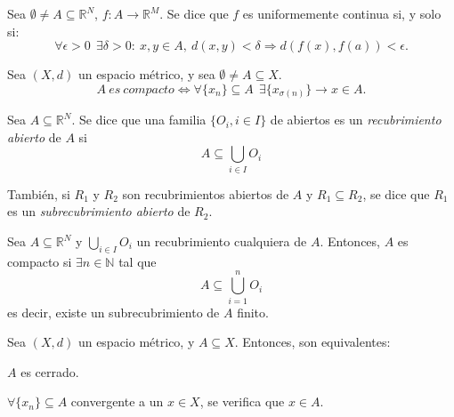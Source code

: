 \begin{ndef}
Sea $\emptyset \ne A \subseteq \mathbb{R}^N$, $f:A \longrightarrow \mathbb{R}^M$. Se dice que $f$ es uniformemente continua si, y solo si: $$\forall \epsilon > 0 \ \ \exists \delta > 0 : \ x,y \in A,\ d(x,y) < \delta \Rightarrow d(f(x),f(a)) < \epsilon.$$
\end{ndef}


\begin{ndef}
Sea $(X,d)$ un espacio métrico, y sea $\emptyset \ne A \subseteq X$. $$A\ es\ compacto \iff \forall \{x_n\} \subseteq A\ \ \exists \{x_{\sigma(n)}\} \rightarrow x\in A.$$
\end{ndef}

\begin{ndef}
	Sea $A \subseteq \mathbb{R}^N$. Se dice que una familia $\{O_i, i\in I\}$ de abiertos es un \emph{recubrimiento abierto} de $A$ si
	\[
		A \subseteq \bigcup_{i\in I} O_i
	\]

	También, si $R_1$ y $R_2$ son recubrimientos abiertos de $A$ y $R_1 \subseteq R_2$, se dice que $R_1$ es un \emph{subrecubrimiento abierto} de $R_2$.
\end{ndef}

\begin{nprop}
	Sea $A \subseteq \mathbb{R}^N$ y $\bigcup_{i\in I} O_i$ un recubrimiento cualquiera de $A$. Entonces, $A$ es compacto si $\exists n\in \mathbb N$ tal que
	\[
	A \subseteq \bigcup_{i=1}^n O_i
	\]
	es decir, existe un subrecubrimiento de $A$ finito.
\end{nprop}

\begin{nprop}
Sea $(X,d)$ un espacio métrico, y $A\subseteq X$. Entonces, son equivalentes:

\begin{nlist}
\item $A$ es cerrado.
\item $\forall \{x_n\} \subseteq A$ convergente a un $x \in X$, se verifica que $x\in A$.
\end{nlist}

\end{nprop}

